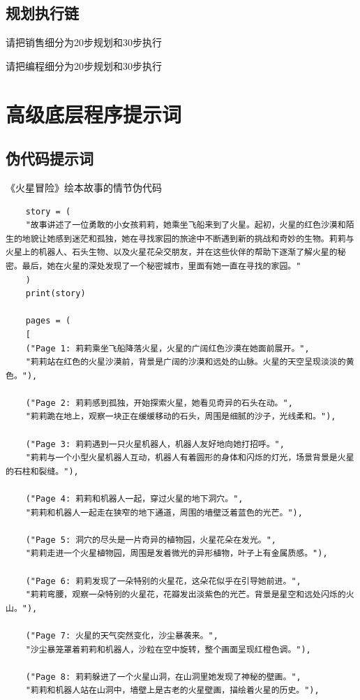 \documentclass[12pt]{book}
\begin{document}
\section{规划执行链}
请把销售细分为20步规划和30步执行

请把编程细分为20步规划和30步执行

\chapter{高级底层程序提示词}
\section{伪代码提示词}
《火星冒险》绘本故事的情节伪代码
	\begin{lstlisting}
	story = (
	"故事讲述了一位勇敢的小女孩莉莉，她乘坐飞船来到了火星。起初，火星的红色沙漠和陌生的地貌让她感到迷茫和孤独，她在寻找家园的旅途中不断遇到新的挑战和奇妙的生物。莉莉与火星上的机器人、石头生物、以及火星花朵交朋友，并在这些伙伴的帮助下逐渐了解火星的秘密。最后，她在火星的深处发现了一个秘密城市，里面有她一直在寻找的家园。"
	)
	print(story)
	
	pages = (
	[
	("Page 1: 莉莉乘坐飞船降落火星，火星的广阔红色沙漠在她面前展开。",
	"莉莉站在红色的火星沙漠前，背景是广阔的沙漠和远处的山脉。火星的天空呈现淡淡的黄色。"),
	
	("Page 2: 莉莉感到孤独，开始探索火星，她看见奇异的石头在动。",
	"莉莉跪在地上，观察一块正在缓缓移动的石头，周围是细腻的沙子，光线柔和。"),
	
	("Page 3: 莉莉遇到一只火星机器人，机器人友好地向她打招呼。",
	"莉莉与一个小型火星机器人互动，机器人有着圆形的身体和闪烁的灯光，场景背景是火星的石柱和裂缝。"),
	
	("Page 4: 莉莉和机器人一起，穿过火星的地下洞穴。",
	"莉莉和机器人一起走在狭窄的地下通道，周围的墙壁泛着蓝色的光芒。"),
	
	("Page 5: 洞穴的尽头是一片奇异的植物园，火星花朵在发光。",
	"莉莉走进一个火星植物园，周围是发着微光的异形植物，叶子上有金属质感。"),
	
	("Page 6: 莉莉发现了一朵特别的火星花，这朵花似乎在引导她前进。",
	"莉莉弯腰，观察一朵特别的火星花，花瓣发出淡紫色的光芒。背景是星空和远处闪烁的火山。"),
	
	("Page 7: 火星的天气突然变化，沙尘暴袭来。",
	"沙尘暴笼罩着莉莉和机器人，沙粒在空中旋转，整个画面呈现红橙色调。"),
	
	("Page 8: 莉莉躲进了一个火星山洞，在山洞里她发现了神秘的壁画。",
	"莉莉和机器人站在山洞中，墙壁上是古老的火星壁画，描绘着火星的历史。"),
	

\end{lstlisting}
\end{document}
